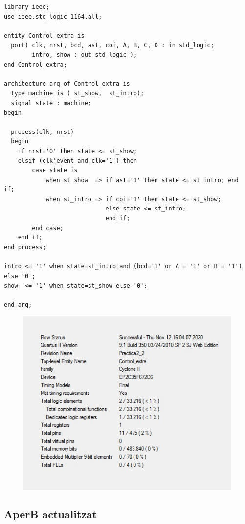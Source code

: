 \documentclass[12pt, a4papre]{article}
\begin{document}
			\begin{lstlisting}[style=vhdl, frame=single, basicstyle=\tiny]
library ieee;
use ieee.std_logic_1164.all;

entity Control_extra is
  port( clk, nrst, bcd, ast, coi, A, B, C, D : in std_logic;
		intro, show : out std_logic );
end Control_extra;

architecture arq of Control_extra is
  type machine is ( st_show,  st_intro);
  signal state : machine;
begin

  process(clk, nrst) 
  begin
	if nrst='0' then state <= st_show;
	elsif (clk'event and clk='1') then
		case state is
			when st_show  => if ast='1' then state <= st_intro; end if;
			when st_intro => if coi='1' then state <= st_show; 
							 else state <= st_intro;
							 end if;
		end case;
	end if;
end process;

intro <= '1' when state=st_intro and (bcd='1' or A = '1' or B = '1') else '0';
show  <= '1' when state=st_show else '0';

end arq;
\end{lstlisting}
	\begin{figure}[H]
		\begin{center}
		\includegraphics[width=130mm]{informeControlextra.jpeg}
		\end{center}
	\end{figure}

	\subsection{AperB actualitzat}
	
\end{document}

